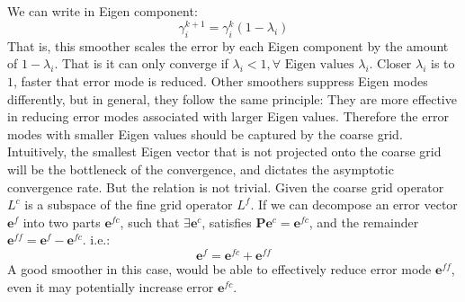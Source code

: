  We can write in Eigen component:
  \begin{equation}
  \gamma^{k+1}_i = \gamma^k_i(1-\lambda_i)
  \end{equation}
  That is, this smoother scales the error by each Eigen component by the amount of $1-\lambda_i$. That is it can only converge if $\lambda_i < 1, \forall \text{ Eigen values } \lambda_i$. Closer $\lambda_i$ is to $1$, faster that error mode is reduced. Other smoothers suppress Eigen modes differently, but in general, they follow the same principle: They are more effective in reducing error modes associated with larger Eigen values. Therefore the error modes with smaller Eigen values should be captured by the coarse grid. Intuitively, the smallest Eigen vector that is not projected onto the coarse grid will be the bottleneck of the convergence, and dictates the asymptotic convergence rate. But the relation is not trivial. Given the coarse grid operator $L^c$ is a subspace of the fine grid operator $L^f$. If we can decompose an error vector $\mathbf{e}^f$ into two parts $\mathbf{e}^{fc}$, such that $\exists \mathbf{e}^{c}$, satisfies $\mathbf{P}\mathbf{e}^{c} = \mathbf{e}^{fc}$, and the remainder $\mathbf{e}^{ff} = \mathbf{e}^f - \mathbf{e}^{fc}$. i.e.:
  $$
  \mathbf{e}^f = \mathbf{e}^{fc} + \mathbf{e}^{ff}
  $$
 A good smoother in this case, would be able to effectively reduce error mode $\mathbf{e}^{ff}$,  even it may potentially increase error $\mathbf{e}^{fc}$. 
